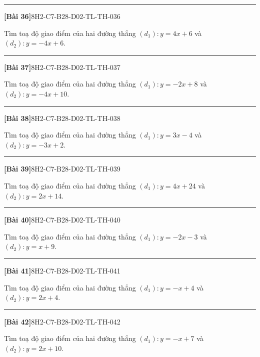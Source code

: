 \documentclass[12pt,a4paper]{article}
\newif\ifloigiai
\newenvironment{cauhoi}[2]{%
  \par\medskip\noindent\rule{\textwidth}{0.4pt}\par\nopagebreak
  \noindent\textbf{[#1]}\hfill{\scriptsize\ttfamily #2}\par\nopagebreak\smallskip}{\par}
\newcommand{\loigiai}[1]{\ifloigiai\par\smallskip\noindent\textit{Lời giải.} #1\par\fi}
\begin{document}
\begin{cauhoi}{Bài 36}{8H2-C7-B28-D02-TL-TH-036}
Tìm toạ độ giao điểm của hai đường thẳng $(d_1): y=4x+6$ và $(d_2): y=-4x+6$.
\loigiai{Hoành độ giao điểm là nghiệm của phương trình $4x+6=-4x+6$, suy ra $8x=0$ nên $x=0$. Thay vào $(d_1)$: $y=4\cdot(0)+6=6$. Vậy giao điểm là $(0;6)$.}
\end{cauhoi}
\begin{cauhoi}{Bài 37}{8H2-C7-B28-D02-TL-TH-037}
Tìm toạ độ giao điểm của hai đường thẳng $(d_1): y=-2x+8$ và $(d_2): y=-4x+10$.
\loigiai{Hoành độ giao điểm là nghiệm của phương trình $-2x+8=-4x+10$, suy ra $2x=2$ nên $x=1$. Thay vào $(d_1)$: $y=-2\cdot(1)+8=6$. Vậy giao điểm là $(1;6)$.}
\end{cauhoi}
\begin{cauhoi}{Bài 38}{8H2-C7-B28-D02-TL-TH-038}
Tìm toạ độ giao điểm của hai đường thẳng $(d_1): y=3x-4$ và $(d_2): y=-3x+2$.
\loigiai{Hoành độ giao điểm là nghiệm của phương trình $3x-4=-3x+2$, suy ra $6x=6$ nên $x=1$. Thay vào $(d_1)$: $y=3\cdot(1)-4=-1$. Vậy giao điểm là $(1;-1)$.}
\end{cauhoi}
\begin{cauhoi}{Bài 39}{8H2-C7-B28-D02-TL-TH-039}
Tìm toạ độ giao điểm của hai đường thẳng $(d_1): y=4x+24$ và $(d_2): y=2x+14$.
\loigiai{Hoành độ giao điểm là nghiệm của phương trình $4x+24=2x+14$, suy ra $2x=-10$ nên $x=-5$. Thay vào $(d_1)$: $y=4\cdot(-5)+24=4$. Vậy giao điểm là $(-5;4)$.}
\end{cauhoi}
\begin{cauhoi}{Bài 40}{8H2-C7-B28-D02-TL-TH-040}
Tìm toạ độ giao điểm của hai đường thẳng $(d_1): y=-2x-3$ và $(d_2): y=x+9$.
\loigiai{Hoành độ giao điểm là nghiệm của phương trình $-2x-3=x+9$, suy ra $-3x=12$ nên $x=-4$. Thay vào $(d_1)$: $y=-2\cdot(-4)-3=5$. Vậy giao điểm là $(-4;5)$.}
\end{cauhoi}
\begin{cauhoi}{Bài 41}{8H2-C7-B28-D02-TL-TH-041}
Tìm toạ độ giao điểm của hai đường thẳng $(d_1): y=-x+4$ và $(d_2): y=2x+4$.
\loigiai{Hoành độ giao điểm là nghiệm của phương trình $-x+4=2x+4$, suy ra $-3x=0$ nên $x=0$. Thay vào $(d_1)$: $y=-1\cdot(0)+4=4$. Vậy giao điểm là $(0;4)$.}
\end{cauhoi}
\begin{cauhoi}{Bài 42}{8H2-C7-B28-D02-TL-TH-042}
Tìm toạ độ giao điểm của hai đường thẳng $(d_1): y=-x+7$ và $(d_2): y=2x+10$.
\loigiai{Hoành độ giao điểm là nghiệm của phương trình $-x+7=2x+10$, suy ra $-3x=3$ nên $x=-1$. Thay vào $(d_1)$: $y=-1\cdot(-1)+7=8$. Vậy giao điểm là $(-1;8)$.}
\end{cauhoi}
\end{document}
